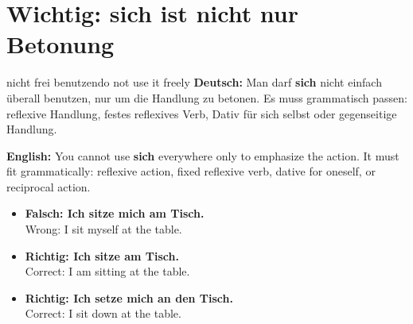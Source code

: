 \documentclass[a4paper,11pt]{article}
\newcommand{\GermanText}[1]{\textbf{Deutsch: }#1\par}
\newcommand{\EnglishText}[1]{{\small\color{SoftGray}\textbf{English: }#1\par}}
\newcommand{\ExampleItem}[2]{\item \textbf{#1}\\{\small\color{SoftGray}#2}}
\begin{document}
    \section{Wichtig: sich ist nicht nur Betonung}
        
        \begin{grammarentry}{nicht frei benutzen}{do not use it freely}
            \GermanText{Man darf \textbf{sich} nicht einfach überall benutzen, nur um die Handlung zu betonen. Es muss grammatisch passen: reflexive Handlung, festes reflexives Verb, Dativ für sich selbst oder gegenseitige Handlung.}
            \EnglishText{You cannot use \textbf{sich} everywhere only to emphasize the action. It must fit grammatically: reflexive action, fixed reflexive verb, dative for oneself, or reciprocal action.}
            
            \begin{exbox}
                \begin{itemize}
                    \ExampleItem{Falsch: Ich sitze mich am Tisch.}{Wrong: I sit myself at the table.}
                    \ExampleItem{Richtig: Ich sitze am Tisch.}{Correct: I am sitting at the table.}
                    \ExampleItem{Richtig: Ich setze mich an den Tisch.}{Correct: I sit down at the table.}
                \end{itemize}
            \end{exbox}
        \end{grammarentry}
\end{document}
